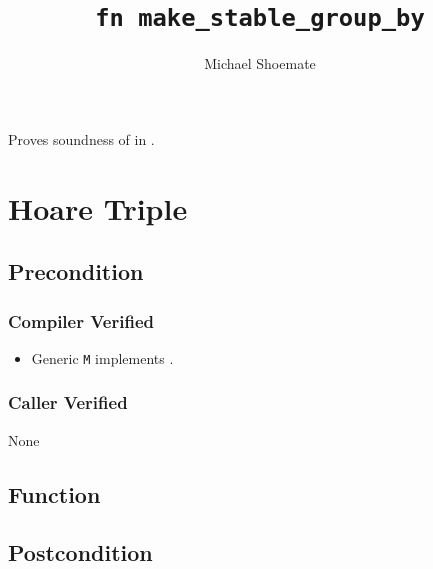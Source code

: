 \documentclass{article}
\title{\texttt{fn make\_stable\_group\_by}}
\author{Michael Shoemate}
\begin{document}
\maketitle  


\contrib

Proves soundness of  
in .

\section{Hoare Triple}
\subsection*{Precondition}
\subsubsection*{Compiler Verified}
\begin{itemize}
    \item Generic \texttt{M} implements .
\end{itemize}

\subsubsection*{Caller Verified}
None

\subsection*{Function}
\label{sec:python-pseudocode}


\subsection*{Postcondition}
\end{document}
